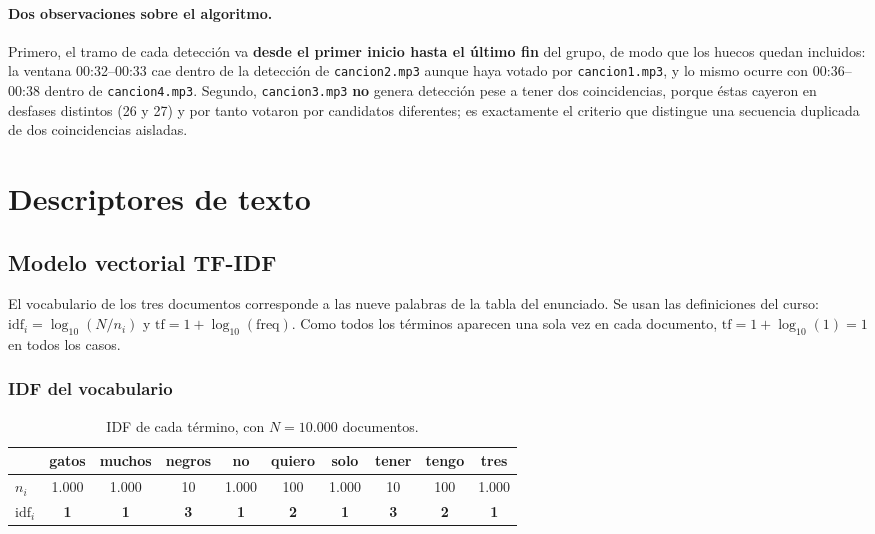 \documentclass[11pt, a4paper]{article}
\newcommand{\code}[1]{\texttt{#1}}
\begin{document}
\paragraph{Dos observaciones sobre el algoritmo.} Primero, el tramo de cada detección va
\textbf{desde el primer inicio hasta el último fin} del grupo, de modo que los huecos quedan
incluidos: la ventana 00:32--00:33 cae dentro de la detección de \code{cancion2.mp3} aunque haya
votado por \code{cancion1.mp3}, y lo mismo ocurre con 00:36--00:38 dentro de
\code{cancion4.mp3}. Segundo, \code{cancion3.mp3} \textbf{no} genera detección pese a tener dos
coincidencias, porque éstas cayeron en desfases distintos (26 y 27) y por tanto votaron por
candidatos diferentes; es exactamente el criterio que distingue una secuencia duplicada de dos
coincidencias aisladas.

\section{Descriptores de texto}

\subsection{Modelo vectorial TF-IDF}

El vocabulario de los tres documentos corresponde a las nueve palabras de la tabla del enunciado. Se
usan las definiciones del curso: $\mathrm{idf}_i = \log_{10}(N/n_i)$ y
$\mathrm{tf} = 1 + \log_{10}(\mathrm{freq})$. Como todos los términos aparecen una sola vez en cada
documento, $\mathrm{tf} = 1 + \log_{10}(1) = 1$ en todos los casos.

\subsubsection{IDF del vocabulario}

\begin{table}[H]
\centering
\caption{IDF de cada término, con $N = 10.000$ documentos.}
\small
\begin{tabular}{@{}lccccccccc@{}}
\toprule
& gatos & muchos & negros & no & quiero & solo & tener & tengo & tres \\
\midrule
$n_i$ & 1.000 & 1.000 & 10 & 1.000 & 100 & 1.000 & 10 & 100 & 1.000 \\
$\mathrm{idf}_i$ & \textbf{1} & \textbf{1} & \textbf{3} & \textbf{1} & \textbf{2} & \textbf{1}
& \textbf{3} & \textbf{2} & \textbf{1} \\
\bottomrule
\end{tabular}
\end{table}
\end{document}
